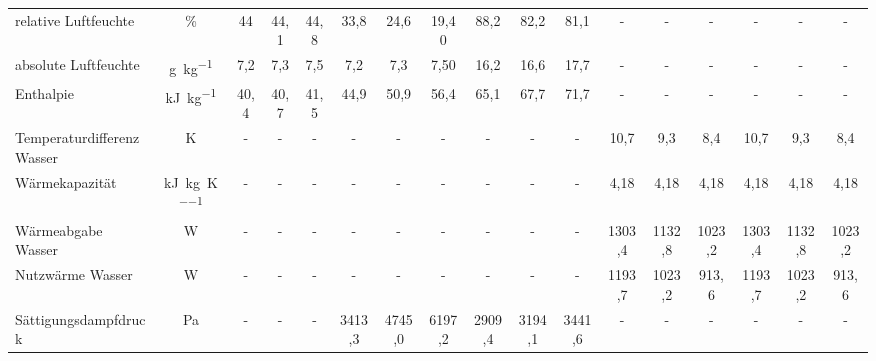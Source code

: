 \begin{landscape}
\begin{table}[h!]
{\begin{tabular}{l|c|c|c|c|c|c|c|c|c|c|c|c|c|c|c|c}
					relative Luftfeuchte & \%    & \multicolumn{1}{c|}{44} & \multicolumn{1}{c|}{44,1} &
					\multicolumn{1}{c|}{44,8} 
					& 33,8  & 24,6  & 19,40 
					& 88,2  & 82,2  & 81,1  & -     & -     & -     & -     & -     & - \\
					absolute Luftfeuchte & \si{\gram \per \kg}  
					& \multicolumn{1}{c|}{7,2} & \multicolumn{1}{c|}{7,3} & \multicolumn{1}{c|}{7,5} 
					& 7,2   & 7,3   & 7,50  
					& 16,2  & 16,6  & 17,7 & -     & -     & -     & -     & -     & - \\
					Enthalpie & \si{\kilo \joule \per \kg} & \multicolumn{1}{c|}{40,4} & \multicolumn{1}{c|}{40,7} & \multicolumn{1}{c|}{41,5} 
					& 44,9  & 50,9  & 56,4  
					& 65,1  & 67,7  & 71,7  & -     & -     & -     & -     & -     & - \\
					\hline
					Temperaturdifferenz  Wasser & K     & -     & -     & -     & \multicolumn{1}{c|}{-} & \multicolumn{1}{c|}{-} & \multicolumn{1}{c|}{-} & \multicolumn{1}{c|}{-} & \multicolumn{1}{c|}{-} & \multicolumn{1}{c|}{-} 
					& \multicolumn{1}{c|}{10,7} & \multicolumn{1}{c|}{9,3} & \multicolumn{1}{c|}{8,4}
					& \multicolumn{1}{c|}{10,7} & 9,3   & 8,4 \\
					Wärmekapazität & \si{\kilo \joule \per \kg \per \kelvin} & -     & -     & -     & \multicolumn{1}{c|}{-} & \multicolumn{1}{c|}{-} & \multicolumn{1}{c|}{-} & \multicolumn{1}{c|}{-} & \multicolumn{1}{c|}{-} & \multicolumn{1}{c|}{-}
					& \multicolumn{1}{c|}{4,18} & \multicolumn{1}{c|}{4,18} & \multicolumn{1}{c|}{4,18} & \multicolumn{1}{c|}{4,18} & 4,18  & 4,18 \\
					Wärmeabgabe Wasser & W     & -     & -     & -     & \multicolumn{1}{c|}{-} & \multicolumn{1}{c|}{-} & \multicolumn{1}{c|}{-} & \multicolumn{1}{c|}{-} & \multicolumn{1}{c|}{-} & \multicolumn{1}{c|}{-} & \multicolumn{1}{c|}{1303,4} & \multicolumn{1}{c|}{1132,8} & \multicolumn{1}{c|}{1023,2} & \multicolumn{1}{c|}{1303,4} & 1132,8 & 1023,2 \\
					Nutzwärme Wasser & W     & -     & -     & -     & \multicolumn{1}{c|}{-} & \multicolumn{1}{c|}{-} & \multicolumn{1}{c|}{-} & \multicolumn{1}{c|}{-} & \multicolumn{1}{c|}{-} & \multicolumn{1}{c|}{-} & \multicolumn{1}{c|}{1193,7} & \multicolumn{1}{c|}{1023,2} & \multicolumn{1}{c|}{913,6} & \multicolumn{1}{c|}{1193,7} & 1023,2 & 913,6 \\
					\hline
					Sättigungsdampfdruck & Pa    & -     & -     & -     & 3413,3 & 4745,0 & 6197,2 & 2909,4 & 3194,1 & 3441,6 & -     & -     & -     & -     & -     & - \\

\end{tabular}}
\end{table}
\end{landscape}
